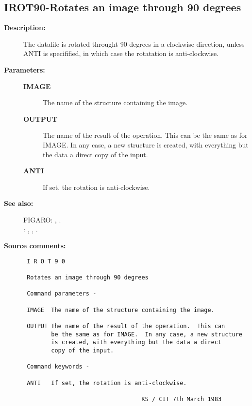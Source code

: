 \subsection{IROT90-\label{IROT90}Rotates an image through 90 degrees}
\begin{description}

\item [{\bf Description:}]
 The datafile is rotated throught 90 degrees in a clockwise
 direction, unless ANTI is specifified, in which case the
 rotatation is anti-clockwise.

\item [{\bf Parameters:}]
\begin{description}
\item [{\bf IMAGE}]
 The name of the structure containing the image.
\item [{\bf OUTPUT}]
 The name of the result of the operation.  This can be the same
 as  for IMAGE.  In any case, a new structure is created, with
 everything but the data a direct copy of the input.
\item [{\bf ANTI}]
 If set, the rotation is anti-clockwise.
\end{description}

\item [{\bf See also:}]
FIGARO: , .\\
: , , .\\

\item [{\bf Source comments:}]
\begin{verbatim}
 I R O T 9 0

 Rotates an image through 90 degrees

 Command parameters -

 IMAGE  The name of the structure containing the image.

 OUTPUT The name of the result of the operation.  This can
        be the same as for IMAGE.  In any case, a new structure
        is created, with everything but the data a direct
        copy of the input.

 Command keywords -

 ANTI   If set, the rotation is anti-clockwise.

                                  KS / CIT 7th March 1983
\end{verbatim}
\end{description}
